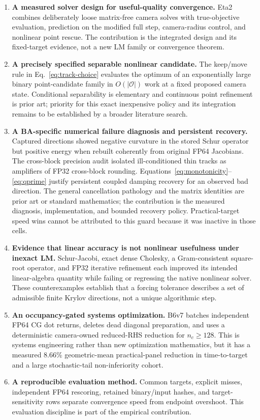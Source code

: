\documentclass[10pt]{article}
\newcommand{\Oset}{\mathcal{O}}
\newcommand{\targettime}{time-to-target}
\begin{document}
\begin{enumerate}
  \item \textbf{A measured solver design for useful-quality convergence.}  Eta2 combines deliberately loose matrix-free camera solves with true-objective evaluation, prediction on the modified full step, camera-radius control, and nonlinear point rescue.  The contribution is the integrated design and its fixed-target evidence, not a new LM family or convergence theorem.

  \item \textbf{A precisely specified separable nonlinear candidate.}  The keep/move rule in Eq.~\eqref{eq:track-choice} evaluates the optimum of an exponentially large binary point-candidate family in $O(|\Oset|)$ work at a fixed proposed camera state.  Conditional separability is elementary and continuous point refinement is prior art; priority for this exact inexpensive policy and its integration remains to be established by a broader literature search.

  \item \textbf{A BA-specific numerical failure diagnosis and persistent recovery.}  Captured directions showed negative curvature in the stored Schur operator but positive energy when rebuilt coherently from original FP64 Jacobians.  The cross-block precision audit isolated ill-conditioned thin tracks as amplifiers of FP32 cross-block rounding.  Equations~\eqref{eq:monotonicity}--\eqref{eq:qprime} justify persistent coupled damping recovery for an observed bad direction.  The general cancellation pathology and the matrix identities are prior art or standard mathematics; the contribution is the measured diagnosis, implementation, and bounded recovery policy.  Practical-target speed wins cannot be attributed to this guard because it was inactive in those cells.

  \item \textbf{Evidence that linear accuracy is not nonlinear usefulness under inexact LM.}  Schur-Jacobi, exact dense Cholesky, a Gram-consistent square-root operator, and FP32 iterative refinement each improved its intended linear-algebra quantity while failing or regressing the native nonlinear solver.  These counterexamples establish that a forcing tolerance describes a set of admissible finite Krylov directions, not a unique algorithmic step.

  \item \textbf{An occupancy-gated systems optimization.}  B6v7 batches independent FP64 CG dot returns, deletes dead diagonal preparation, and uses a deterministic camera-owned reduced-RHS reduction for $n_c\ge128$.  This is systems engineering rather than new optimization mathematics, but it has a measured 8.66\% geometric-mean practical-panel reduction in \targettime{} and a large stochastic-tail non-inferiority cohort.

  \item \textbf{A reproducible evaluation method.}  Common targets, explicit misses, independent FP64 rescoring, retained binary/input hashes, and target-sensitivity rows separate convergence speed from endpoint overshoot.  This evaluation discipline is part of the empirical contribution.
\end{enumerate}
\end{document}
